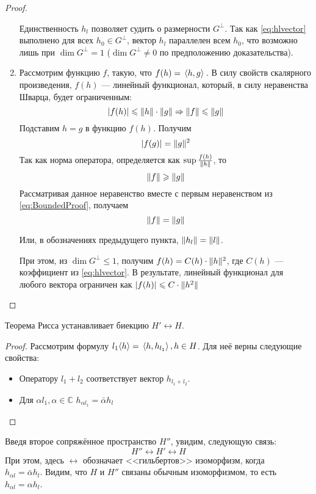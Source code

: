 \documentclass[12pt]{article}
\begin{document}
\begin{proof}
\begin{enumerate}
			{\footnotesize
				Единственность $h_l$ позволяет судить о размерности $G^{\perp}$.
				Так как \eqref{eq:hlvector} выполнено для всех $h_0 \in G^{\perp}$, вектор $h_l$ параллелен всем $h_0$, 
				что возможно лишь при $\dim{G^{\perp}} = 1$ ($\dim{G^{\perp}} \neq 0$ по предположению доказательства).
			}
			
			\item Рассмотрим функцию $f$, такую, что $f(h) = \, \langle h, g \rangle \,$. В силу свойств скалярного произведения, 
			$f(h)$ --- линейный функционал, который, в силу неравенства Шварца, будет ограниченным:
			\begin{equation} \label{eq:BoundedProof}
				|f(h)| \leqslant \| h \| \cdot \| g \| \Rightarrow \| f \| \leqslant \| g \|
			\end{equation}
			Подставим $h = g$ в функцию $f(h)$. Получим
			$$|f(g)| = \| g \|^2$$
			Так как норма оператора, определяется как $\sup \frac{f(h)}{\| h \|}$, то 
			$$\| f \| \geqslant \| g \|$$
			Рассматривая данное неравенство вместе с первым неравенством из \eqref{eq:BoundedProof}, получаем 
			$$ \| f \| = \| g \| $$
			
			Или, в обозначениях предыдущего пункта, $\| h_l \| = \| l \|$.
			
			{\footnotesize
				При этом, из $\dim{G^{\perp}} \leq 1$, получим $f(h) = C(h) \cdot \| h \|^2$, где $C(h)$ --- коэффициент из 
				\eqref{eq:hlvector}. В результате, линейный функционал для любого вектора ограничен как 
				$|f(h)| \leqslant C \cdot \| h^2 \|$
			}
		\end{enumerate}
	\end{proof}
	
	\begin{note}
		Теорема Рисса устанавливает биекцию $H' \leftrightarrow H$.
	\end{note}
	\begin{proof}
		Рассмотрим формулу $l_1\langle h \rangle = \, \langle h, h_{l_1} \rangle \,, h \in H$. Для неё верны следующие
		свойства:
		\begin{itemize}
			\item Оператору $l_1 + l_2$ соответствует вектор $h_{l_1+l_2}$.
			\item Для $\alpha l_1, \alpha \in \mathbb{C}$ $h_{\alpha l_1} = \bar{\alpha} h_l$
		\end{itemize}
	\end{proof}
	
	Введя второе сопряжённое пространство $H''$, увидим, следующую связь:
	$$H'' \leftrightarrow H' \leftrightarrow H$$
	При этом, здесь $\leftrightarrow$ обозначает <<гильбертов>> изоморфизм, когда \\
	$h_{\alpha l} = \bar{\alpha} h_l$. %
	Видим, что $H$ и $H''$ связаны обычным изоморфизмом, то есть $h_{\alpha l} = \alpha h_l$.
	
\end{document}
